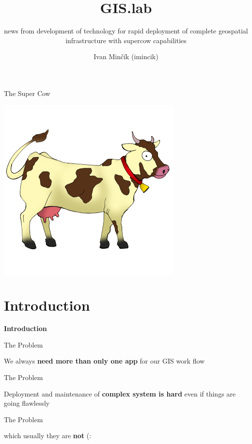 \documentclass[12pt]{beamer}
\title{GIS.lab}
\subtitle{news from development of technology for rapid deployment of complete geospatial infrastructure with supercow capabilities}
\author{Ivan Minčík (imincik)}
\institute{FOSS4G Europe 2015, Como, Italy}
\date{}
\begin{document}
\begin{frame}
	\titlepage
\end{frame}

\begin{frame}{The Super Cow}
	\begin{center}
		\includegraphics[keepaspectratio=true,height=0.6\textheight]{images/cow.png}
	\end{center}
\end{frame}


\section{Introduction}
\begin{frame}
	\begin{center}
		\LARGE\textbf{Introduction}	
	\end{center}
\end{frame}

\begin{frame}{The Problem}
	\begin{center}
		We always \textbf{need more than only one app} for our GIS work flow
	\end{center}
\end{frame}

\begin{frame}{The Problem}
	\begin{center}
		Deployment and maintenance of \textbf{complex system is hard} even if things are going flawlessly
		\end{center}
\end{frame}

\begin{frame}{The Problem}
	\begin{center}
		which usually they are \textbf{not} (:
	\end{center}
\end{frame}
\end{document}
